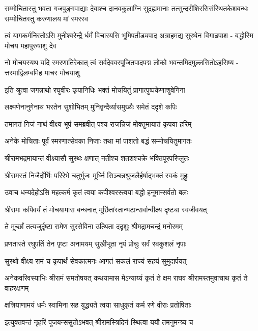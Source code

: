 \fourlineindentedshloka
{सम्मोचितास्तु भवता गजपुङ्गवाद्याः}
{देवाश्च दानवकुलाग्नि सुदह्यमानाः}
{तत्सुन्दरीशिरसिसंस्थितकेशबन्धः}
{सम्मोचितस्तु करुणालय मां स्मरस्व}%

\fourlineindentedshloka
{त्वं यागकर्मनिरतोऽसि मुनीश्वरेन्द्रै}
{र्धर्मं विचारयसि भूमिपतीड्यपाद}
{अत्राहमद्य सुरथेन विगाढपाश -}
{बद्धोस्मि मोचय महापुरुषाशु देव}%

\fourlineindentedshloka
{नो मोचयस्यथ यदि स्मरणातिरेकात्}
{त्वं सर्वदेववरपूजितपादपद्म}
{लोको भवन्तमिदमुल्लसितोऽहसिष्य -}
{त्तस्माद्विलम्बमिह माचर मोचयाशु}%

\twolineshloka
{इति श्रुत्वा जगन्नाथो रघुवीरः कृपानिधिः}
{भक्तं मोचयितुं प्रागात्पुष्पकेणाशुवेगिना}%

\twolineshloka
{लक्ष्मणेनानुगेनाथ भरतेन सुशोभितम्}
{मुनिवृन्दैर्व्यासमुख्यैः समेतं ददृशे कपिः}%

\twolineshloka
{तमागतं निजं नाथं वीक्ष्य भूपं समब्रवीत्}
{पश्य राजन्निजं मोक्तुमायातं कृपया हरिम्}%

\twolineshloka
{अनेके मोचिताः पूर्वं स्मरणात्सेवका निजाः}
{तथा मां पाशतो बद्धं सम्मोचयितुमागतः}%

\twolineshloka
{श्रीरामभद्रमायान्तं वीक्ष्यासौ सुरथः क्षणात्}
{नतीश्च शतशश्चक्रे भक्तिपूरपरिप्लुतः}%

\twolineshloka
{श्रीरामस्तं निजैर्दोर्भिः परिरेभे चतुर्भुजः}
{मूर्ध्नि सिञ्चन्नश्रुजलैर्हर्षाद्भक्तं स्वकं मुहुः}%

\twolineshloka
{उवाच धन्यदेहोऽसि महत्कर्म कृतं त्वया}
{कपीश्वरस्त्वया बद्धो हनूमान्सर्वतो बलः}%

\twolineshloka
{श्रीरामः कपिवर्यं तं मोचयामास बन्धनात्}
{मूर्छितांस्तान्भटान्सर्वान्वीक्ष्य दृष्ट्या स्वजीवयत्}%

\twolineshloka
{ते मूर्च्छां तत्यजुर्दृष्टा रामेण सुरसेविना}
{उत्थिता ददृशुः श्रीमद्रामचन्द्रं मनोरमम्}%

\twolineshloka
{प्रणतास्ते रघुपतिं तेन पृष्टा अनामयम्}
{सुखीभूता नृपं प्रोचुः सर्वं स्वकुशलं नृपाः}%

\twolineshloka
{सुरथो वीक्ष्य रामं च कृपार्थं सेवकात्मनः}
{आगतं सकलं राज्यं सहयं सुमुदार्पयत्}%

\threelineshloka
{अनेकवरिवस्याभिः श्रीरामं समतोषयत्}
{कथयामास मेऽन्याय्यं कृतं ते क्षम राघव}
{श्रीरामस्तमुवाचाथ कृतं ते वाहरक्षणम्}%

\twolineshloka
{क्षत्त्रियाणामयं धर्मः स्वामिना सह युद्ध्यते}
{त्वया साधुकृतं कर्म रणे वीराः प्रतोषिताः}%

\twolineshloka
{इत्युक्तवन्तं नृहरिं पूजयन्ससुतोऽभवत्}
{श्रीरामस्त्रिदिनं स्थित्वा ययौ तमनुमन्त्र्य च}%


